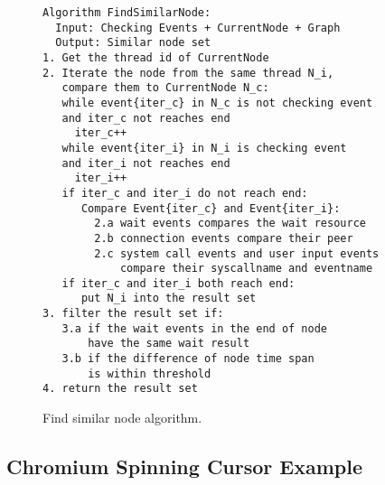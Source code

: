 \begin{figure}[tb]
\footnotesize\begin{verbatim}
Algorithm FindSimilarNode:
  Input: Checking Events + CurrentNode + Graph
  Output: Similar node set
1. Get the thread id of CurrentNode
2. Iterate the node from the same thread N_i, 
   compare them to CurrentNode N_c:
   while event{iter_c} in N_c is not checking event
   and iter_c not reaches end
   	 iter_c++
   while event{iter_i} in N_i is checking event
   and iter_i not reaches end
     iter_i++
   if iter_c and iter_i do not reach end:
      Compare Event{iter_c} and Event{iter_i}:
        2.a wait events compares the wait resource
        2.b connection events compare their peer
        2.c system call events and user input events
            compare their syscallname and eventname
   if iter_c and iter_i both reach end:
      put N_i into the result set
3. filter the result set if:
   3.a if the wait events in the end of node
       have the same wait result
   3.b if the difference of node time span
       is within threshold
4. return the result set
\end{verbatim}
    \caption{\xxx Find similar node algorithm.}
    \label{fig:alg-findsimilarnode}
\end{figure}



\subsection{Chromium Spinning Cursor Example}


